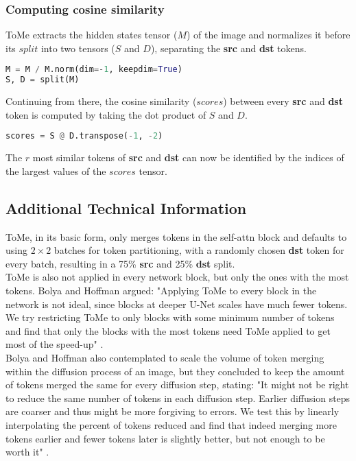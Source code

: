 \subsubsection*{Computing cosine similarity}
ToMe extracts the hidden states tensor (\(M\)) of the image and normalizes it before its \(split\) into two tensors (\(S\) and \(D\)), separating the \textbf{src} and \textbf{dst} tokens.
\begin{lstlisting}[language=Python]
M = M / M.norm(dim=-1, keepdim=True)
S, D = split(M)
\end{lstlisting}
Continuing from there, the cosine similarity (\(scores\)) between every \textbf{src} and \textbf{dst} token is computed by taking the dot product of \(S\) and \(D\).
\begin{lstlisting}[language=Python]
scores = S @ D.transpose(-1, -2)
\end{lstlisting}
The \(r\) most similar tokens of \textbf{src} and \textbf{dst} can now be identified by the indices of the largest values of the \(scores\) tensor.



\subsection{Additional Technical Information}
ToMe, in its basic form, only merges tokens in the self-attn block and defaults to using \(2 \times 2\) batches for token partitioning, with a randomly chosen \textbf{dst} token for every batch, resulting in a 75\% \textbf{src} and 25\% \textbf{dst} split. \\
ToMe is also not applied in every network block, but only the ones with the most tokens. Bolya and Hoffman argued:
"Applying ToMe to every block in the network is not ideal, since blocks at deeper U-Net scales have much fewer tokens. We try restricting ToMe to only blocks with some minimum number of tokens and find that only the blocks with the most tokens need ToMe applied to get most of the speed-up" \cite{bolya2023tomesd}.\\
Bolya and Hoffman also contemplated to scale the volume of token merging within the diffusion process of an image, but they concluded to keep the amount of tokens merged the same for every diffusion step, stating: "It might not be right to reduce the same number of tokens in each diffusion step. Earlier diffusion steps are coarser and thus might be more forgiving to errors. We test this by linearly interpolating the percent of tokens reduced and find that indeed merging more tokens earlier and fewer tokens later is slightly better, but not enough to be worth it" \cite{bolya2023tomesd}.